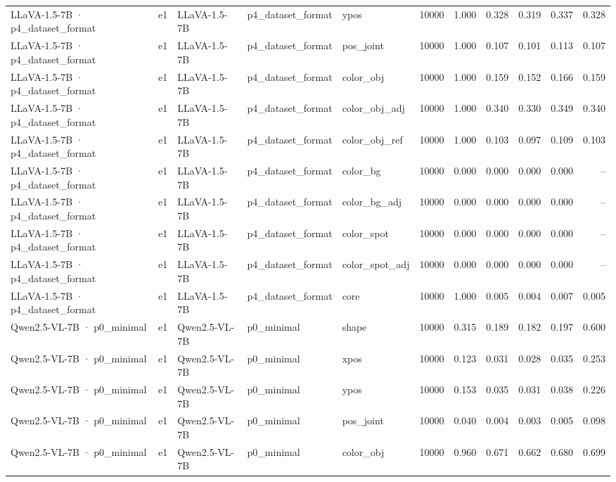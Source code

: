 \begin{tabular}{lllllrrrrrr}
LLaVA-1.5-7B · p4\_dataset\_format & e1 & LLaVA-1.5-7B & p4\_dataset\_format & ypos & 10000 & 1.000 & 0.328 & 0.319 & 0.337 & 0.328 \\
LLaVA-1.5-7B · p4\_dataset\_format & e1 & LLaVA-1.5-7B & p4\_dataset\_format & pos\_joint & 10000 & 1.000 & 0.107 & 0.101 & 0.113 & 0.107 \\
LLaVA-1.5-7B · p4\_dataset\_format & e1 & LLaVA-1.5-7B & p4\_dataset\_format & color\_obj & 10000 & 1.000 & 0.159 & 0.152 & 0.166 & 0.159 \\
LLaVA-1.5-7B · p4\_dataset\_format & e1 & LLaVA-1.5-7B & p4\_dataset\_format & color\_obj\_adj & 10000 & 1.000 & 0.340 & 0.330 & 0.349 & 0.340 \\
LLaVA-1.5-7B · p4\_dataset\_format & e1 & LLaVA-1.5-7B & p4\_dataset\_format & color\_obj\_ref & 10000 & 1.000 & 0.103 & 0.097 & 0.109 & 0.103 \\
LLaVA-1.5-7B · p4\_dataset\_format & e1 & LLaVA-1.5-7B & p4\_dataset\_format & color\_bg & 10000 & 0.000 & 0.000 & 0.000 & 0.000 & -- \\
LLaVA-1.5-7B · p4\_dataset\_format & e1 & LLaVA-1.5-7B & p4\_dataset\_format & color\_bg\_adj & 10000 & 0.000 & 0.000 & 0.000 & 0.000 & -- \\
LLaVA-1.5-7B · p4\_dataset\_format & e1 & LLaVA-1.5-7B & p4\_dataset\_format & color\_spot & 10000 & 0.000 & 0.000 & 0.000 & 0.000 & -- \\
LLaVA-1.5-7B · p4\_dataset\_format & e1 & LLaVA-1.5-7B & p4\_dataset\_format & color\_spot\_adj & 10000 & 0.000 & 0.000 & 0.000 & 0.000 & -- \\
LLaVA-1.5-7B · p4\_dataset\_format & e1 & LLaVA-1.5-7B & p4\_dataset\_format & core & 10000 & 1.000 & 0.005 & 0.004 & 0.007 & 0.005 \\
Qwen2.5-VL-7B · p0\_minimal & e1 & Qwen2.5-VL-7B & p0\_minimal & shape & 10000 & 0.315 & 0.189 & 0.182 & 0.197 & 0.600 \\
Qwen2.5-VL-7B · p0\_minimal & e1 & Qwen2.5-VL-7B & p0\_minimal & xpos & 10000 & 0.123 & 0.031 & 0.028 & 0.035 & 0.253 \\
Qwen2.5-VL-7B · p0\_minimal & e1 & Qwen2.5-VL-7B & p0\_minimal & ypos & 10000 & 0.153 & 0.035 & 0.031 & 0.038 & 0.226 \\
Qwen2.5-VL-7B · p0\_minimal & e1 & Qwen2.5-VL-7B & p0\_minimal & pos\_joint & 10000 & 0.040 & 0.004 & 0.003 & 0.005 & 0.098 \\
Qwen2.5-VL-7B · p0\_minimal & e1 & Qwen2.5-VL-7B & p0\_minimal & color\_obj & 10000 & 0.960 & 0.671 & 0.662 & 0.680 & 0.699 \\

\end{tabular}
